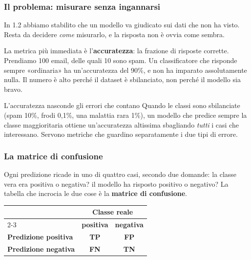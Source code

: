 \documentclass[12pt]{extarticle}
\begin{document}
\subsubsection{Il problema: misurare senza ingannarsi}

\noindent In 1.2 abbiamo stabilito che un modello va giudicato sui dati che non ha visto. Resta da decidere \emph{come} misurarlo, e la risposta non è ovvia come sembra.

\noindent La metrica più immediata è l'\textbf{accuratezza}: la frazione di risposte corrette. Prendiamo 100 email, delle quali 10 sono spam. Un classificatore che risponde sempre «ordinaria» ha un'accuratezza del 90\%, e non ha imparato assolutamente nulla. Il numero è alto perché il dataset è sbilanciato, non perché il modello sia bravo.

\begin{attenzionebox}{L'accuratezza nasconde gli errori che contano}
Quando le classi sono sbilanciate (spam 10\%, frodi 0{,}1\%, una malattia rara 1\%), un modello che predice sempre la classe maggioritaria ottiene un'accuratezza altissima sbagliando \emph{tutti} i casi che interessano. Servono metriche che guardino separatamente i due tipi di errore.
\end{attenzionebox}

\subsubsection{La matrice di confusione}

\noindent Ogni predizione ricade in uno di quattro casi, secondo due domande: la classe vera era positiva o negativa? il modello ha risposto positivo o negativo? La tabella che incrocia le due cose è la \textbf{matrice di confusione}.

\begin{center}
\small
\begin{tabular}{lcc}
    \toprule
     & \multicolumn{2}{c}{\textbf{Classe reale}} \\
    \cmidrule(lr){2-3}
     & \textbf{positiva} & \textbf{negativa} \\
    \midrule
    \textbf{Predizione positiva} & \textbf{TP} & \textbf{FP} \\
    \textbf{Predizione negativa} & \textbf{FN} & \textbf{TN} \\
    \bottomrule
\end{tabular}
\end{center}
\end{document}
